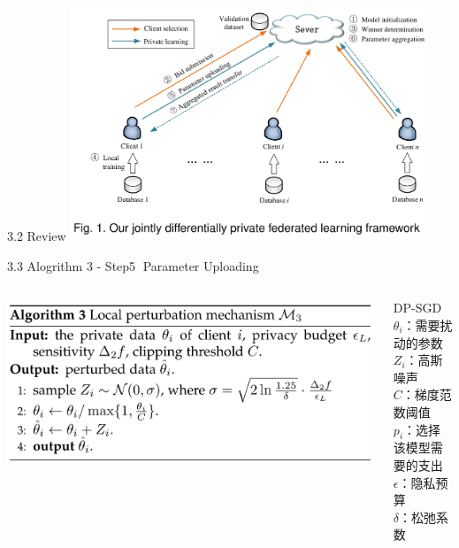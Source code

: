 \documentclass{sintefbeamer}
\theoremstyle{definition}
\begin{document}
\begin{frame}{3.2 Review}{\empty}
\centering
\vspace{0.5em}\includegraphics[width=0.8\textwidth]{images/overview}
\end{frame}

\begin{frame}{3.3 Alogrithm 3 - Step\textcircled{5} Parameter Uploading}{\empty}
\begin{columns}
\begin{column}{0.6\textwidth}
\vspace{0.5em}
\includegraphics[width=1\textwidth]{images/algo3}
\end{column}
\begin{column}{0.4\textwidth}
DP-SGD\\
$\theta_i$：需要扰动的参数\\
$Z_i$：高斯噪声\\
$C$：梯度范数阈值\\
$p_i$：选择该模型需要的支出\\
$\epsilon$：隐私预算\\
$\delta$：松弛系数
\end{column}
\end{columns}
\end{frame}
\end{document}
